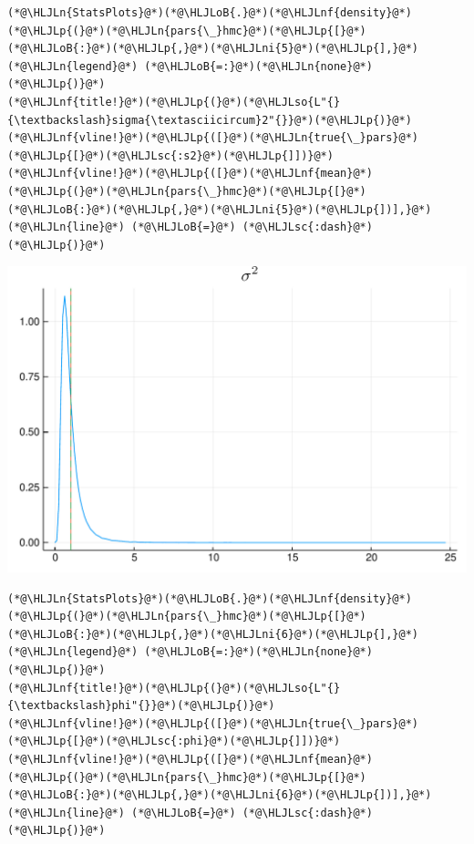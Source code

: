 \documentclass[12pt,a4paper]{article}
\newcommand{\HLJLn}[1]{#1}
\newcommand{\HLJLnf}[1]{\textcolor[RGB]{66,102,213}{#1}}
\newcommand{\HLJLsc}[1]{\textcolor[RGB]{201,61,57}{#1}}
\newcommand{\HLJLso}[1]{\textcolor[RGB]{201,61,57}{#1}}
\newcommand{\HLJLni}[1]{\textcolor[RGB]{59,151,46}{#1}}
\newcommand{\HLJLoB}[1]{\textcolor[RGB]{102,102,102}{\textbf{#1}}}
\newcommand{\HLJLp}[1]{#1}
\begin{document}
\begin{lstlisting}
(*@\HLJLn{StatsPlots}@*)(*@\HLJLoB{.}@*)(*@\HLJLnf{density}@*)(*@\HLJLp{(}@*)(*@\HLJLn{pars{\_}hmc}@*)(*@\HLJLp{[}@*)(*@\HLJLoB{:}@*)(*@\HLJLp{,}@*)(*@\HLJLni{5}@*)(*@\HLJLp{],}@*) (*@\HLJLn{legend}@*) (*@\HLJLoB{=:}@*)(*@\HLJLn{none}@*)(*@\HLJLp{)}@*)
(*@\HLJLnf{title!}@*)(*@\HLJLp{(}@*)(*@\HLJLso{L"{}{\textbackslash}sigma{\textasciicircum}2"{}}@*)(*@\HLJLp{)}@*)
(*@\HLJLnf{vline!}@*)(*@\HLJLp{([}@*)(*@\HLJLn{true{\_}pars}@*)(*@\HLJLp{[}@*)(*@\HLJLsc{:s2}@*)(*@\HLJLp{]])}@*)
(*@\HLJLnf{vline!}@*)(*@\HLJLp{([}@*)(*@\HLJLnf{mean}@*)(*@\HLJLp{(}@*)(*@\HLJLn{pars{\_}hmc}@*)(*@\HLJLp{[}@*)(*@\HLJLoB{:}@*)(*@\HLJLp{,}@*)(*@\HLJLni{5}@*)(*@\HLJLp{])],}@*) (*@\HLJLn{line}@*) (*@\HLJLoB{=}@*) (*@\HLJLsc{:dash}@*)(*@\HLJLp{)}@*)
\end{lstlisting}

\includegraphics[width=\linewidth]{figures/dsge_and_julia_39_1.pdf}

\begin{lstlisting}
(*@\HLJLn{StatsPlots}@*)(*@\HLJLoB{.}@*)(*@\HLJLnf{density}@*)(*@\HLJLp{(}@*)(*@\HLJLn{pars{\_}hmc}@*)(*@\HLJLp{[}@*)(*@\HLJLoB{:}@*)(*@\HLJLp{,}@*)(*@\HLJLni{6}@*)(*@\HLJLp{],}@*) (*@\HLJLn{legend}@*) (*@\HLJLoB{=:}@*)(*@\HLJLn{none}@*)(*@\HLJLp{)}@*)
(*@\HLJLnf{title!}@*)(*@\HLJLp{(}@*)(*@\HLJLso{L"{}{\textbackslash}phi"{}}@*)(*@\HLJLp{)}@*)
(*@\HLJLnf{vline!}@*)(*@\HLJLp{([}@*)(*@\HLJLn{true{\_}pars}@*)(*@\HLJLp{[}@*)(*@\HLJLsc{:phi}@*)(*@\HLJLp{]])}@*)
(*@\HLJLnf{vline!}@*)(*@\HLJLp{([}@*)(*@\HLJLnf{mean}@*)(*@\HLJLp{(}@*)(*@\HLJLn{pars{\_}hmc}@*)(*@\HLJLp{[}@*)(*@\HLJLoB{:}@*)(*@\HLJLp{,}@*)(*@\HLJLni{6}@*)(*@\HLJLp{])],}@*) (*@\HLJLn{line}@*) (*@\HLJLoB{=}@*) (*@\HLJLsc{:dash}@*)(*@\HLJLp{)}@*)
\end{lstlisting}
\end{document}
